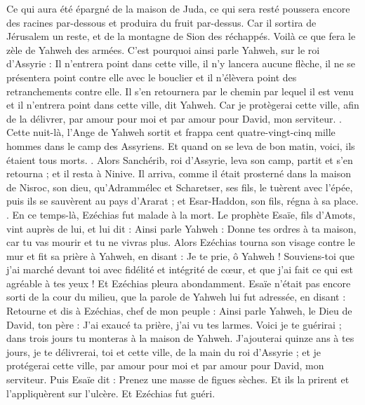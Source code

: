 \begin{multicols}{2}
Ce qui aura été épargné de la maison de Juda, ce qui sera resté poussera encore des racines par-dessous et produira du fruit par-dessus.
Car il sortira de Jérusalem un reste, et de la montagne de Sion des réchappés. Voilà ce que fera le zèle de Yahweh des armées.
C'est pourquoi ainsi parle Yahweh, sur le roi d'Assyrie : Il n'entrera point dans cette ville, il n'y lancera aucune flèche, il ne se présentera point contre elle avec le bouclier et il n'élèvera point des retranchements contre elle.
Il s'en retournera par le chemin par lequel il est venu et il n'entrera point dans cette ville, dit Yahweh.
Car je protègerai cette ville, afin de la délivrer, par amour pour moi et par amour pour David, mon serviteur.
.
Cette nuit-là, l'Ange de Yahweh sortit et frappa cent quatre-vingt-cinq mille hommes dans le camp des Assyriens. Et quand on se leva de bon matin, voici, ils étaient tous morts.
.
Alors Sanchérib, roi d'Assyrie, leva son camp, partit et s'en retourna ; et il resta à Ninive.
Il arriva, comme il était prosterné dans la maison de Nisroc, son dieu, qu'Adrammélec et Scharetser, ses fils, le tuèrent avec l'épée, puis ils se sauvèrent au pays d'Ararat ; et Esar-Haddon, son fils, régna à sa place.
.
\VerseOne{}En ce temps-là, Ezéchias fut malade à la mort. Le prophète Esaïe, fils d'Amots, vint auprès de lui, et lui dit : Ainsi parle Yahweh : Donne tes ordres à ta maison, car tu vas mourir et tu ne vivras plus.
Alors Ezéchias tourna son visage contre le mur et fit sa prière à Yahweh, en disant :
Je te prie, ô Yahweh ! Souviens-toi que j'ai marché devant toi avec fidélité et intégrité de cœur, et que j'ai fait ce qui est agréable à tes yeux ! Et Ezéchias pleura abondamment.
Esaïe n'était pas encore sorti de la cour du milieu, que la parole de Yahweh lui fut adressée, en disant :
Retourne et dis à Ezéchias, chef de mon peuple : Ainsi parle Yahweh, le Dieu de David, ton père : J'ai exaucé ta prière, j'ai vu tes larmes. Voici je te guérirai ; dans trois jours tu monteras à la maison de Yahweh.
J'ajouterai quinze ans à tes jours, je te délivrerai, toi et cette ville, de la main du roi d'Assyrie ; et je protégerai cette ville, par amour pour moi et par amour pour David, mon serviteur.
Puis Esaïe dit : Prenez une masse de figues sèches. Et ils la prirent et l'appliquèrent sur l'ulcère. Et Ezéchias fut guéri.

\end{multicols}
